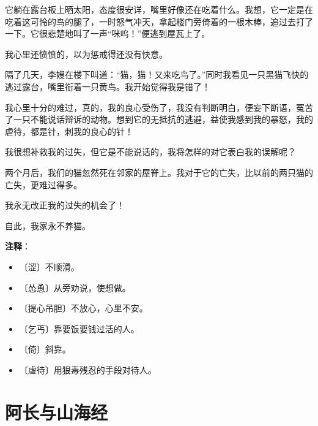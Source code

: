 \documentclass[12pt,UTF-8,openany]{ctexbook}
\begin{document}
\begin{normalsize}
    它躺在露台板上晒太阳，态度很安详，嘴里好像还在吃着什么。我想，它一定是在吃着这可怜的鸟的腿了，一时怒气冲天，拿起楼门旁倚着的一根木棒，追过去打了一下。它很悲楚地叫了一声“咪呜！”便逃到屋瓦上了。
    
    我心里还愤愤的，以为惩戒得还没有快意。
    
    隔了几天，李嫂在楼下叫道：“猫，猫！又来吃鸟了。”同时我看见一只黑猫飞快的逃过露台，嘴里衔着一只黄鸟。我开始觉得我是错了！
    
    我心里十分的难过，真的，我的良心受伤了，我没有判断明白，便妄下断语，冤苦了一只不能说话辩诉的动物。想到它的无抵抗的逃避，益使我感到我的暴怒，我的虐待，都是针，刺我的良心的针！
    
    我很想补救我的过失，但它是不能说话的，我将怎样的对它表白我的误解呢？
    
    两个月后，我们的猫忽然死在邻家的屋脊上。我对于它的亡失，比以前的两只猫的亡失，更难过得多。
    
    我永无改正我的过失的机会了！
    
    自此，我家永不养猫。
    
\end{normalsize}


\newpage

\textbf{注释}：

\vspace{-1em}

\begin{itemize}
    \setlength\itemsep{-0.2em}
    \item 〔涩〕不顺滑。
    \item 〔怂恿〕从旁劝说，使想做。
    \item 〔提心吊胆〕不放心，心里不安。
    \item 〔乞丐〕靠要饭要钱过活的人。
    \item 〔倚〕斜靠。
    \item 〔虐待〕用狠毒残忍的手段对待人。
\end{itemize}

\chapter{阿长与山海经}
\end{document}
